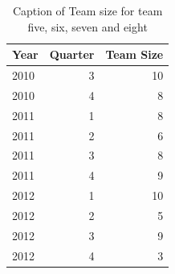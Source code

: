 \documentclass[UKenglish]{ifimaster}  %
\begin{document}
\begin{table}[!htbp]
\begin{adjustwidth}{-0cm}{}
{{\begin{tabular}{ | l | r | r | }
\hline
	 Year & Quarter & Team Size \\ \hline
	2010 & 3 & 10  \\ \hline
	2010 & 4 & 8   \\ \hline
	2011 & 1 & 8   \\ \hline
	2011 & 2 & 6   \\ \hline
	2011 & 3 & 8   \\ \hline
	2011 & 4 & 9   \\ \hline
	2012 & 1 & 10   \\ \hline
	2012 & 2 & 5   \\ \hline
	2012 & 3 & 9   \\ \hline
	2012 & 4 & 3   \\ \hline
\end{tabular}
}
}
\end{adjustwidth}
\caption[Optional caption for list of figures]{Caption of Team size for team five, six, seven and eight}
\label{DS:1:2}
\end{table}
\end{document}
